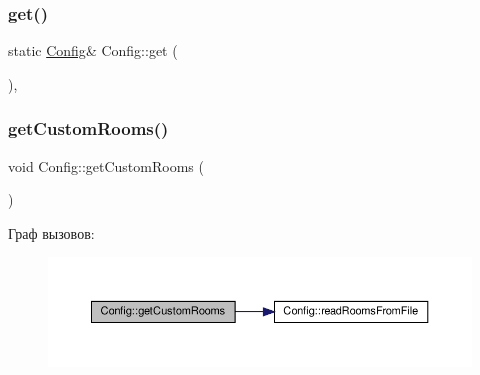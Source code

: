 \mbox{\label{class_config_a5154d96acc76c1fae8c564f3705fe197}} 
\subsubsection{\texorpdfstring{get()}{get()}\hspace{0.1cm}{\footnotesize\ttfamily [2/2]}}
{\footnotesize\ttfamily static \hyperlink{class_config}{Config}\& Config\+::get (\begin{DoxyParamCaption}{ }\end{DoxyParamCaption})\hspace{0.3cm}{\ttfamily [inline]}, {\ttfamily [static]}}

\mbox{\label{class_config_af15e32047889f0d0e304cf4f5f218711}} 
\subsubsection{\texorpdfstring{get\+Custom\+Rooms()}{getCustomRooms()}\hspace{0.1cm}{\footnotesize\ttfamily [1/2]}}
{\footnotesize\ttfamily void Config\+::get\+Custom\+Rooms (\begin{DoxyParamCaption}{ }\end{DoxyParamCaption})\hspace{0.3cm}{\ttfamily [private]}}

Граф вызовов\+:\nopagebreak
\begin{figure}[H]
\begin{center}
\leavevmode
\includegraphics[width=350pt]{class_config_af15e32047889f0d0e304cf4f5f218711_cgraph}
\end{center}
\end{figure}
\mbox{\label{class_config_af15e32047889f0d0e304cf4f5f218711}} 
